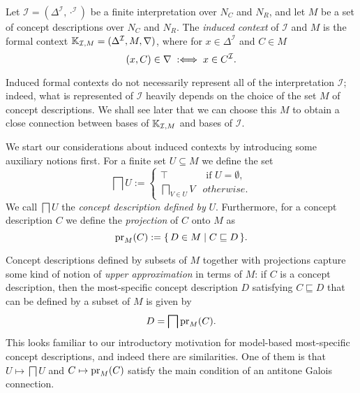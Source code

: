 \begin{Definition}
  \label{def:induced-context}
  Let $\mathcal{I} = (\Delta^{\mathcal{I}}, \cdot^{\mathcal{I}})$ be a finite
  interpretation over $N_C$ and $N_R$, and let $M$ be a set of concept descriptions over
  $N_C$ and $N_R$.  The \emph{induced context} of $\mathcal{I}$ and $M$ is the formal
  context ${\mathbb{K}}_{\mathcal{I}, M} = (\Delta^{\mathcal{I}}, M, \nabla)$, where for $x \in
  \Delta^{\mathcal{I}}$ and $C \in M$
  \begin{equation*}
    (x, C) \in \nabla \;:\Longleftrightarrow\; x \in C^{\mathcal{I}}.
  \end{equation*}  
\end{Definition}

Induced formal contexts do not necessarily represent all of the interpretation
$\mathcal{I}$; indeed, what is represented of $\mathcal{I}$ heavily depends on the choice
of the set $M$ of concept descriptions.  We shall see later that we can choose this $M$ to
obtain a close connection between bases of ${\mathbb{K}}_{\mathcal{I}, M}$ and bases of
$\mathcal{I}$.

We start our considerations about induced contexts by introducing some auxiliary notions
first.  For a finite set $U \subseteq M$ we define the set
\begin{equation*}
  \bigsqcap U :=
  \begin{cases}
    \top & \text{ if } U = \emptyset, \\
    \bigsqcap_{V \in U} V & otherwise.
  \end{cases}
\end{equation*}
We call $\bigsqcap U$ the \emph{concept description defined by} $U$.  Furthermore, for a
concept description $C$ we define the \emph{projection} of $C$ onto $M$ as
\begin{equation*}
  \operatorname{pr}_M(C) := {\{\, D \in M \mid C \sqsubseteq D \,\}}.
\end{equation*}

Concept descriptions defined by subsets of $M$ together with projections capture some kind
of notion of \emph{upper approximation} in terms of $M$: if $C$ is a concept description,
then the most-specific concept description $D$ satisfying $C \sqsubseteq D$ that can be
defined by a subset of $M$ is given by
\begin{equation*}
  D = \bigsqcap \operatorname{pr}_M(C).
\end{equation*}
This looks familiar to our introductory motivation for model-based most-specific concept
descriptions, and indeed there are similarities.  One of them is that $U \mapsto \bigsqcap
U$ and $C \mapsto \operatorname{pr}_M(C)$ satisfy the main condition of an antitone Galois connection.


